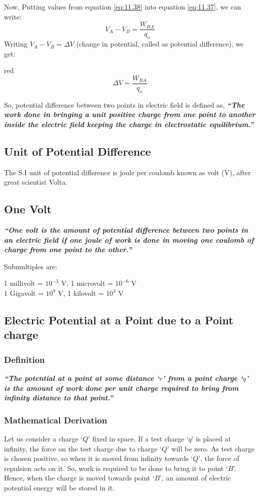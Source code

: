 Now, Putting values from equation \ref{eq:11.38} into equation \ref{eq:11.37}, we can
write:
\begin{equation}
  V_{A} - V_{B} = \frac{W_{BA}}{q_{o}} \nonumber
\end{equation}
Writing $V_{A} - V_{B} = \Delta V$ (change in potential, called as potential difference),
we get:
\begin{mybox}{red}{}
\begin{equation}\label{eq:11.42}
  \Delta V = \frac{W_{BA}}{q_{o}}
\end{equation}
\end{mybox}
So, potential difference between two points in electric field is defined as,
\textit{\textbf{“The work done in bringing a unit positive charge from one point to another
inside the electric field keeping the charge in electrostatic equilibrium.”}}
\subsection*{Unit of Potential Difference}
The S.I unit of potential difference is joule per coulomb known 
as volt (V), after great scientist Volta.
\subsection*{One Volt}
\textit{\textbf{“One volt is the amount of potential difference between
two points in an electric field if one joule of work is done in moving
one coulomb of charge from one point to the other.”}}

\noindent Submultiples are:
\begin{center}
  1 millivolt = $10^{-3}$ V, 1 microvolt = $10^{-6}$ V \\
  1 Gigavolt = $10^{9}$ V, 1 kilovolt = $10^{3}$ V
\end{center}

\subsection{Electric Potential at a Point due to a Point charge}
\subsubsection{Definition}
\textit{\textbf{“The potential at a point at some distance `$r$' from a point charge `$q$' is the amount of work done per
unit charge required to bring from infinity distance to that point.”}}
\subsubsection{Mathematical Derivation}
Let us consider a charge `$Q$' fixed in space. If a test charge `$q$' is placed
at infinity, the force on the test charge due to charge `$Q$' will be zero.
As test charge is chosen positive, so when it is moved from infinity towards `$Q$',
the force of repulsion acts on it. So, work is required to be done to bring it to
point `$B$'. Hence, when the charge is moved towards point `$B$',
an amount of electric potential energy will be stored in it.

